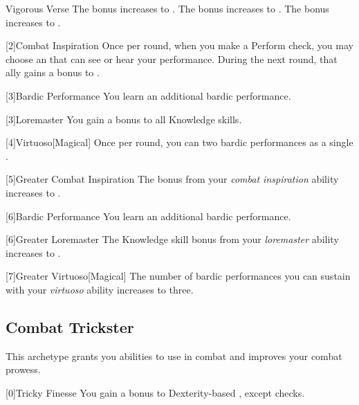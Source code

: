 {\begin{durationability}{Vigorous Verse}
                \rankline
                 The bonus increases to .
                 The bonus increases to .
                 The bonus increases to .
            \end{durationability}
        }

        [2]{Combat Inspiration} Once per round, when you make a Perform check, you may choose an  that can see or hear your performance.
        During the next round, that ally gains a  bonus to .

        [3]{Bardic Performance} You learn an additional bardic performance.

        [3]{Loremaster} You gain a  bonus to all Knowledge skills.

        [4]{Virtuoso}[Magical] Once per round, you can  two bardic performances as a single .

        [5]{Greater Combat Inspiration} The bonus from your \textit{combat inspiration} ability increases to .

        [6]{Bardic Performance} You learn an additional bardic performance.

        [6]{Greater Loremaster} The Knowledge skill bonus from your \textit{loremaster} ability increases to .

        [7]{Greater Virtuoso}[Magical] The number of bardic performances you can sustain with your \textit{virtuoso} ability increases to three.

    \newpage
    \subsection{Combat Trickster}
        This archetype grants you abilities to use in combat and improves your combat prowess.

        [0]{Tricky Finesse} You gain a  bonus to Dexterity-based , except  checks.

